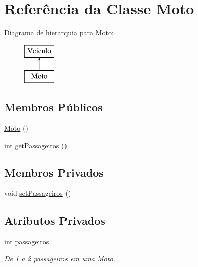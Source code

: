 \hypertarget{class_moto}{}\section{Referência da Classe Moto}
\label{class_moto}
Diagrama de hierarquia para Moto\+:\begin{figure}[H]
\begin{center}
\leavevmode
\includegraphics[height=2.000000cm]{class_moto}
\end{center}
\end{figure}
\subsection*{Membros Públicos}
\begin{DoxyCompactItemize}
\item 
\mbox{\hyperlink{class_moto_af900d6c1d6b9a69fb6b8bdb0c3401603}{Moto}} ()
\item 
int \mbox{\hyperlink{class_moto_af285d528cc9d6e1dd47db8d7a36a08bd}{get\+Passageiros}} ()
\end{DoxyCompactItemize}
\subsection*{Membros Privados}
\begin{DoxyCompactItemize}
\item 
void \mbox{\hyperlink{class_moto_a336f2ac21dee386aef726c3207b113f9}{set\+Passageiros}} ()
\end{DoxyCompactItemize}
\subsection*{Atributos Privados}
\begin{DoxyCompactItemize}
\item 
\mbox{\label{class_moto_a5cf8ea81e47701cfc6a132fdc046071d}} 
int \mbox{\hyperlink{class_moto_a5cf8ea81e47701cfc6a132fdc046071d}{passageiros}}
\begin{DoxyCompactList}\small\item\em De 1 a 2 passageiros em uma \mbox{\hyperlink{class_moto}{Moto}}. \end{DoxyCompactList}\end{DoxyCompactItemize}
